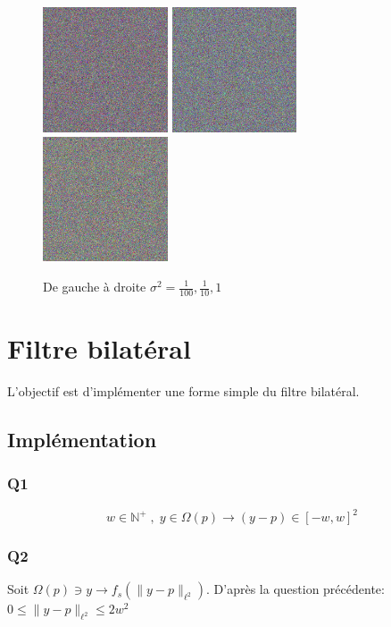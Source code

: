 \documentclass{article}
\begin{document}
\begin{figure}[h]
	\includegraphics[width=0.33\textwidth]{noise001.png}
	\includegraphics[width=0.33\textwidth]{noise01.png}
	\includegraphics[width=0.33\textwidth]{noise10.png}
  \caption{De gauche à droite $\sigma^2 = \frac{1}{100}, \frac{1}{10}, 1$}
\end{figure}



\section{Filtre bilatéral}
L'objectif est d'implémenter une forme simple du filtre bilatéral.
\subsection{Implémentation}
\subsubsection*{Q1}
$$w \in \mathbb{N}^+ \;, \; y \in \Omega(p) \rightarrow (y-p) \in {[{-w}, w]}^2$$
\subsubsection*{Q2}
Soit $\Omega(p) \ni y \rightarrow f_s(\parallel y-p \parallel_{\ell^2})$. 
D'après la question précédente: $ 0 \leq \parallel y-p \parallel_{\ell^2} \leq 2 w^2 $
\end{document}
